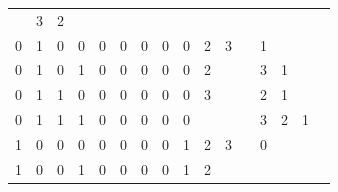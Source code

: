 \begin{table}[htbp]
\begin{minipage}{\textwidth}
\begin{tabular}{cccccccccccccccc}
		\multicolumn{1}{c}{} &
		\multicolumn{1}{c}{3} & \multicolumn{1}{c}{2} & \multicolumn{1}{c}{}&
		\multicolumn{1}{c}{} \\
		\multicolumn{1}{c}{0} & \multicolumn{1}{c}{1} & \multicolumn{1}{c}{0} & \multicolumn{1}{c}{0} &
		\multicolumn{1}{c}{0} & \multicolumn{1}{c}{0} & \multicolumn{1}{c}{0} & \multicolumn{1}{c}{0} &
		\multicolumn{1}{|c}{0} & \multicolumn{1}{c}{2} & \multicolumn{1}{c}{3}&
		\multicolumn{1}{c}{} &
		\multicolumn{1}{c}{1} & \multicolumn{1}{c}{} &
		\multicolumn{1}{c}{}&
		\multicolumn{1}{c}{} \\
		\multicolumn{1}{c}{0} & \multicolumn{1}{c}{1} & \multicolumn{1}{c}{0} & \multicolumn{1}{c}{1} &
		\multicolumn{1}{c}{0} & \multicolumn{1}{c}{0} & \multicolumn{1}{c}{0} & \multicolumn{1}{c}{0} &
		\multicolumn{1}{|c}{0} & \multicolumn{1}{c}{2} & \multicolumn{1}{c}{}&
		\multicolumn{1}{c}{} &
		\multicolumn{1}{c}{3} & \multicolumn{1}{c}{1} & \multicolumn{1}{c}{}&
		\multicolumn{1}{c}{} \\
		\multicolumn{1}{c}{0} & \multicolumn{1}{c}{1} & \multicolumn{1}{c}{1} & \multicolumn{1}{c}{0} &
		\multicolumn{1}{c}{0} & \multicolumn{1}{c}{0} & \multicolumn{1}{c}{0} & \multicolumn{1}{c}{0} &
		\multicolumn{1}{|c}{0} & \multicolumn{1}{c}{3} & \multicolumn{1}{c}{}&
		\multicolumn{1}{c}{} &
		\multicolumn{1}{c}{2} & \multicolumn{1}{c}{1} & \multicolumn{1}{c}{}&
		\multicolumn{1}{c}{} \\
		\multicolumn{1}{c}{0} & \multicolumn{1}{c}{1} & \multicolumn{1}{c}{1} & \multicolumn{1}{c}{1} &
		\multicolumn{1}{c}{0} & \multicolumn{1}{c}{0} & \multicolumn{1}{c}{0} & \multicolumn{1}{c}{0} &
		\multicolumn{1}{|c}{0} & \multicolumn{1}{c}{} &
		\multicolumn{1}{c}{}&
		\multicolumn{1}{c}{} &
		\multicolumn{1}{c}{3} & \multicolumn{1}{c}{2} & \multicolumn{1}{c}{1}&
		\multicolumn{1}{c}{} \\
		\multicolumn{1}{c}{1} & \multicolumn{1}{c}{0} & \multicolumn{1}{c}{0} & \multicolumn{1}{c}{0} &
		\multicolumn{1}{c}{0} & \multicolumn{1}{c}{0} & \multicolumn{1}{c}{0} & \multicolumn{1}{c}{0} &
		\multicolumn{1}{|c}{1} & \multicolumn{1}{c}{2} & \multicolumn{1}{c}{3}&
		\multicolumn{1}{c}{} &
		\multicolumn{1}{c}{0} & \multicolumn{1}{c}{} &
		\multicolumn{1}{c}{}&
		\multicolumn{1}{c}{} \\
		\multicolumn{1}{c}{1} & \multicolumn{1}{c}{0} & \multicolumn{1}{c}{0} & \multicolumn{1}{c}{1} &
		\multicolumn{1}{c}{0} & \multicolumn{1}{c}{0} & \multicolumn{1}{c}{0} & \multicolumn{1}{c}{0} &
		\multicolumn{1}{|c}{1} & \multicolumn{1}{c}{2} & \multicolumn{1}{c}{}& \multicolumn{1}{c}{} &

\end{tabular}
\end{minipage}
\end{table}
